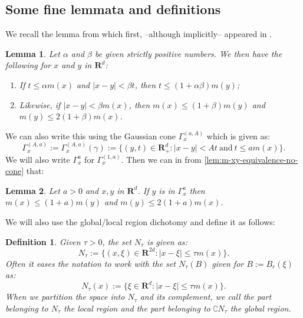 \documentclass[a4paper,oneside,10pt]{amsproc}
\theoremstyle{plain}
\newtheorem{definition}{Definition}
\newtheorem{lemma}{Lemma}
\theoremstyle{remark}
\theoremstyle{definition}
\renewcommand{\leq}{\leqslant}
\renewcommand{\leq}{\leqslant}
\newcommand{\R}{\mathbf R}
\renewcommand{\leq}{\leqslant} %
\begin{document}
\subsection{Some fine lemmata and definitions}
We recall the lemma from \cite[lemma 2.3]{Maas2011b} which first,
 --although implicitly-- appeared in \cite{Mauceri2007}.
\begin{lemma}\label{lem:m-xy-equivalence-no-cone}
  Let $\alpha$ and $\beta$ be given strictly positive numbers. We then
  have the following for $x$ and $y$ in $\R^d$:
  \begin{enumerate}
  \item If $t \leq \alpha m(x)$ and $|x - y| < \beta t$, then $t
    \leq (1 + \alpha \beta) m(y)$;
  \item Likewise, if $|x - y| < \beta m(x)$, then $m(x) \leq (1 +
    \beta) m(y)$ and $m(y) \leq 2 (1 + \beta) m(x)$. 
  \end{enumerate}
\end{lemma}
We can also write this using the Gaussian cone $\Gamma_x^{(a, A)}$
which is given as:
\begin{equation}
  \label{eq:Gaussian-cone}
  \Gamma_x^{(A, a)} := \Gamma_x^{(A, a)}(\gamma) := \{(y, t) \in
  \R^d_+ : |x - y| < At \:\text{and}\: t \leq a m(x)\}.
\end{equation}
We will also write $\Gamma_x^a$ for $\Gamma_x^{(1, a)}$. Then we can
in from \autoref{lem:m-xy-equivalence-no-cone} that:
\begin{lemma}\label{lem:m-xy-equivalence}
  Let $a > 0$ and $x, y$ in $\R^d$. If $y$ is in $\Gamma_x^{a}$ then
  $m(x) \leq (1 + a) m(y)$ and $m(y) \leq 2(1 + a) m(x)$.
\end{lemma}
We will also use the global/local region dichotomy and define it as
follows:
\begin{definition}
  Given $\tau > 0$, the set $N_\tau$ is given as:
  \begin{equation}
    \label{eq:Definition-local-region}
    N_\tau := \{(x, \xi) \in \R^{2d} : |x - \xi| \leq \tau m(x) \}.
  \end{equation}
  Often it eases the notation to work with the set $N_\tau(B)$ given
  for $B := B_r(\xi)$ as:
  \begin{equation}
    \label{eq:Definition-local-region-ball}
    N_\tau(x) := \{\xi \in \R^d : |x - \xi| \leq \tau m(x) \}.
  \end{equation}
  When we partition the space into $N_\tau$ and its complement, we
  call the part belonging to $N_\tau$ the \emph{local region} and the
  part belonging to $\complement N_\tau$ the \emph{global region}.
\end{definition}
\end{document}
